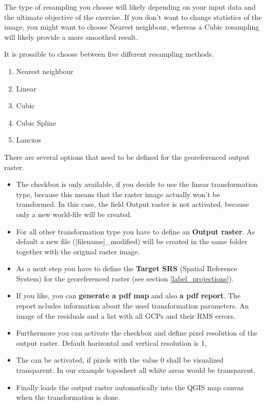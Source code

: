 
The type of resampling you choose will likely depending on your input data
and the ultimate objective of the exercise. If you don't want to change
statistics of the image, you might want to choose Nearest neighbour,
whereas a Cubic resampling will likely provide a more smoothed result.

It is prossible to choose between five different resampling methods.

\begin{enumerate}
\item Nearest neighbour
\item Linear
\item Cubic
\item Cubic Spline
\item Lanczos
\end{enumerate}


There are several options that need to be defined for the georeferenced output 
raster. 

\begin{itemize}[label=--]
\item The checkbox  is only available, if 
you decide to use the linear transformation type, because this means that 
the raster image actually won't be transformed. In this case, the field 
Output raster is not activated, because only a new world-file will be 
created.
\item For all other transformation type you have to define an \textbf{Output 
raster}. As default a new file ([filename]\_modified) will be created in 
the same folder together with the original raster image.   
\item As a next step you have to define the \textbf{Target SRS} 
(Spatial Reference System) for the georeferenced raster 
(see section \ref{label_projections}). 
\item If you like, you can \textbf{generate a pdf map} and also \textbf{a 
pdf report}. The report ncludes information about the used transformation 
parameters. An image of the residuals and a list with all GCPs and their 
RMS errors.
\item Furthermore you can activate the  
checkbox and define pixel resolution of the output raster. Default horizontal 
and vertical resolution is 1,      
\item The  can be activated, if 
pixels with the value 0 shall be visualized transparent. In our example 
toposheet all white areas would be transparent.
\item Finally  loads the output raster 
automatically into the QGIS map canvas when the transformation is done.
\end{itemize}

